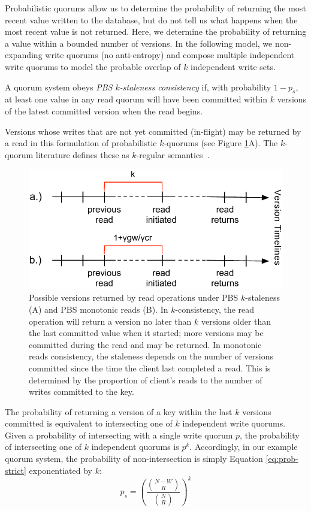 \documentclass{vldb}
\begin{document}
Probabilistic quorums allow us to determine the probability of
returning the most recent value written to the database, but do not
tell us what happens when the most recent value is not returned.
Here, we determine the probability of returning a value within a
bounded number of versions.  In the following model, we non-expanding 
write quorums (no anti-entropy) and compose multiple independent write
quorums to model the probable overlap of $k$ independent write sets.
\begin{definition}
A quorum system obeys \textit{PBS $k$-staleness consistency} if, with
probability $1-p_{s}$, at least one value in any read quorum will
have been committed within $k$ versions of the latest committed
version when the read begins.
\end{definition}
Versions whose writes that are not yet committed (in-flight) may be
returned by a read in this formulation of probabilistic $k$-quorums
(see Figure \ref{fig:timelines}A).  The $k$-quorum literature defines
these as $k$-regular semantics~\cite{non-strict}.

\begin{figure}
\centering
\includegraphics[width=\columnwidth]{figs/timelines.pdf}
\caption{Possible versions returned by read operations under
  PBS $k$-staleness (A) and PBS monotonic reads (B). In
  $k$-consistency, the read operation will return a version no later
  than $k$ versions older than the last committed value when it
  started; more versions may be committed during the read and may be
  returned.  In monotonic reads consistency, the staleness depends on
  the number of versions committed since the time the client last
  completed a read.  This is determined by the proportion of client's
  reads to the number of writes committed to the key.}
\label{fig:timelines}
\end{figure}

The probability of returning a version of a key within the last $k$
versions committed is equivalent to intersecting one of $k$
independent write quorums.  Given a probability of intersecting with a
single write quorum $p$, the probability of intersecting one of $k$
independent quorums is $p^k$.  Accordingly, in our example quorum
system, the probability of non-intersection is simply Equation
\ref{eq:prob-strict} exponentiated by $k$:
\begin{equation}
\label{eq:k-consistency}
p_{s} = \left(\frac{{N-W \choose R}}{{N \choose R}}\right)^k
\end{equation}
\end{document}
